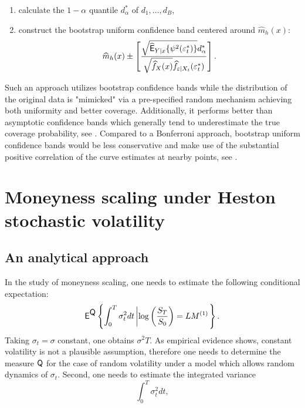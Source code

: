 \documentclass{rQUF2e}
\newcommand{\E}{\mathop{\mbox{\sf E}}}
\newcommand{\QQ}{\mathop{\mbox{\sf Q}}}
\theoremstyle{plain}
\theoremstyle{definition}
\begin{document}
\begin{enumerate}
		\item
		calculate the $1-\alpha$ quantile $d^*_{\alpha}$ of $d_1,\ldots,d_B$,
		\item
		construct the bootstrap uniform confidence band centered around $\widehat{m}_{h}(x)$:
		\begin{equation}
		\widehat{m}_{h}(x) \pm \left[ \frac{ \sqrt{\widehat{\E}_{Y|x}\{\psi^2(\varepsilon_t^{*})\}} d^*_{\alpha}}{\sqrt{\widehat{f}_X (x)} \widehat{f}_{\varepsilon|X_t}(\varepsilon_t^{*})} \right]. 
		\end{equation}
	\end{enumerate}
	
	Such an approach utilizes bootstrap confidence bands while the distribution of the original data is "mimicked" via a pre-specified random mechanism achieving both uniformity and better coverage. Additionally, it performs better than asymptotic confidence bands which generally tend to underestimate the true coverage probability, see \citet{hall_horowitz}. Compared to a Bonferroni approach, bootstrap uniform confidence bands would be less conservative and make use of the substantial positive correlation of the curve estimates at nearby points, see \citet{haerdle_book_reg}.
	
	
	
	\section{Moneyness scaling under Heston stochastic volatility} 
	
	\subsection{An analytical approach}
	
	In the study of moneyness scaling, one needs to estimate the following conditional expectation:
	\begin{equation}
	{\E}^{\QQ}\left\{ \int_{0}^{T}\sigma_t^2 dt \left| \log \left(\frac{S_T}{S_0}\right) = LM^{(1)} \right.\right\}.
	\label{monscex}
	\end{equation}
	Taking $\sigma_t = \sigma$ constant, one obtains $\sigma^2 T$. As empirical evidence shows, constant volatility is not a plausible assumption, therefore one needs to determine the measure $\QQ$ for the case of random volatility under a model which allows random dynamics of $\sigma_t$. Second, one needs to estimate the integrated variance
	\begin{equation}
	\int_{0}^{T}\sigma_t^2 dt,
	\label{intvar}
	\end{equation}
	
\end{document}
